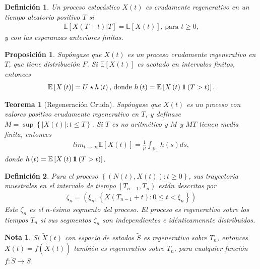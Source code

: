 \documentclass{article}
\newtheorem{Def}{Definición}[section]
\newtheorem{Teo}{Teorema}[section]
\newtheorem{Note}{Nota}[section]
\newtheorem{Prop}{Proposición}[section]
\newcommand{\rea}{\mathbb{R}}
\newcommand{\esp}{\mathbb{E}}
\newcommand{\indora}{\mbox{$1$\hspace{-0.8ex}$1$}}
\numberwithin{equation}{section}
\begin{document}
\begin{Def}
Un proceso estoc\'astico $X\left(t\right)$ es crudamente regenerativo en un tiempo aleatorio positivo $T$ si
\begin{eqnarray*}
\esp\left[X\left(T+t\right)|T\right]=\esp\left[X\left(t\right)\right]\textrm{, para }t\geq0,\end{eqnarray*}
y con las esperanzas anteriores finitas.
\end{Def}

\begin{Prop}
Sup\'ongase que $X\left(t\right)$ es un proceso crudamente regenerativo en $T$, que tiene distribuci\'on $F$. Si $\esp\left[X\left(t\right)\right]$ es acotado en intervalos finitos, entonces
\begin{eqnarray*}
\esp\left[X\left(t\right)\right]=U\star h\left(t\right)\textrm{,  donde }h\left(t\right)=\esp\left[X\left(t\right)\indora\left(T>t\right)\right].
\end{eqnarray*}
\end{Prop}

\begin{Teo}[Regeneraci\'on Cruda]
Sup\'ongase que $X\left(t\right)$ es un proceso con valores positivo crudamente regenerativo en $T$, y def\'inase $M=\sup\left\{|X\left(t\right)|:t\leq T\right\}$. Si $T$ es no aritm\'etico y $M$ y $MT$ tienen media finita, entonces
\begin{eqnarray*}
lim_{t\rightarrow\infty}\esp\left[X\left(t\right)\right]=\frac{1}{\mu}\int_{\rea_{+}}h\left(s\right)ds,
\end{eqnarray*}
donde $h\left(t\right)=\esp\left[X\left(t\right)\indora\left(T>t\right)\right]$.
\end{Teo}

\begin{Def}
Para el proceso $\left\{\left(N\left(t\right),X\left(t\right)\right):t\geq0\right\}$, sus trayectoria muestrales en el intervalo de tiempo $\left[T_{n-1},T_{n}\right)$ est\'an descritas por
\begin{eqnarray*}
\zeta_{n}=\left(\xi_{n},\left\{X\left(T_{n-1}+t\right):0\leq t<\xi_{n}\right\}\right)
\end{eqnarray*}
Este $\zeta_{n}$ es el $n$-\'esimo segmento del proceso. El proceso es regenerativo sobre los tiempos $T_{n}$ si sus segmentos $\zeta_{n}$ son independientes e id\'enticamennte distribuidos.
\end{Def}


\begin{Note}
Si $\tilde{X}\left(t\right)$ con espacio de estados $\tilde{S}$ es regenerativo sobre $T_{n}$, entonces $X\left(t\right)=f\left(\tilde{X}\left(t\right)\right)$ tambi\'en es regenerativo sobre $T_{n}$, para cualquier funci\'on $f:\tilde{S}\rightarrow S$.
\end{Note}
\end{document}
